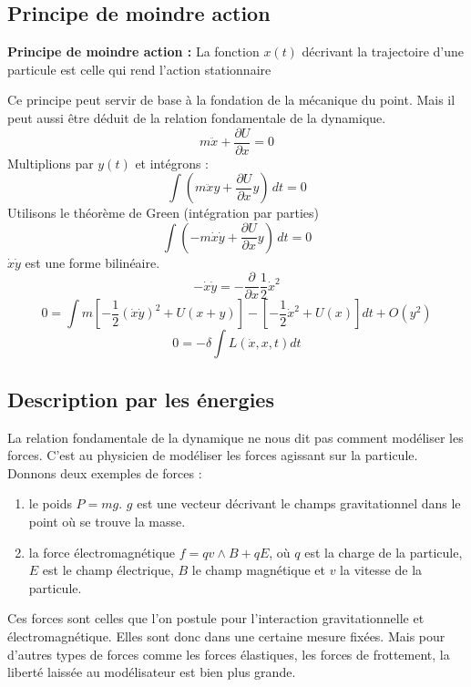 \documentclass[12pt]{book}
\begin{document}
\subsection{Principe de moindre action}\label{secprinmoindreact}
\begin{prin}{\bf Principe de moindre action :} 
La fonction $x(t)$ d\'ecrivant la trajectoire d'une particule est
celle qui rend l'action stationnaire
\end{prin}
Ce principe peut servir de base \`a la fondation de la m\'ecanique du
point. Mais il peut aussi \^etre d\'eduit de la relation fondamentale
de la dynamique\cite{ma:equad:Arnold83}.
\begin{equation}
m \ddot{x}+\frac{\partial U}{\partial x}=0
\end{equation}
Multiplions par $y(t)$ et int\'egrons :
\begin{equation}
\int (m \ddot{x}y +\frac{\partial U}{\partial x}y)\,dt=0
\end{equation}
Utilisons le th\'eor\`eme de Green (int\'egration par parties)
\begin{equation}
\int (-m \dot{x}\dot{y} +\frac{\partial U}{\partial x}y)\,dt=0
\end{equation}
$\dot{x}\dot{y}$ est une forme bilin\'eaire.
\begin{equation}
-\dot{x}\dot{y}=-\frac{\partial }{\partial x}\frac{1}{2}\dot{x}^2
\end{equation}
\begin{equation}
0= \int m
[-\frac{1}{2}(\dot{x}\dot{y})^{2}+U(x+y)]-[-\frac{1}{2}\dot{x}^{2}+U(x)]dt+O(y^{2})
\end{equation}
\begin{equation}
0=-\delta \int L(\dot{x},x,t)dt
\end{equation}
\subsection{Description par les \'energies}
La relation fondamentale de la dynamique ne nous dit pas comment mod\'eliser
les forces. C'est au physicien de mod\'eliser les forces agissant sur la
particule. Donnons deux exemples de forces :
\begin{enumerate}
\item le poids $P=mg$. $g$ est une vecteur d\'ecrivant le champs
  gravitationnel dans le point o\`u se trouve la masse.
\item la force \'electromagn\'etique $f=qv\wedge B+qE$, o\`u $q$ est la charge
  de la particule, $E$ est le champ \'electrique, $B$ le champ magn\'etique et
  $v$ la vitesse de la particule.
\end{enumerate} 
Ces forces sont celles que l'on postule pour l'interaction gravitationnelle et
\'electromagn\'etique. Elles sont donc dans une certaine mesure fix\'ees.
Mais pour d'autres types de forces comme les forces \'elastiques, les forces
de frottement, la libert\'e laiss\'ee au mod\'elisateur est bien plus grande. 
\end{document}
